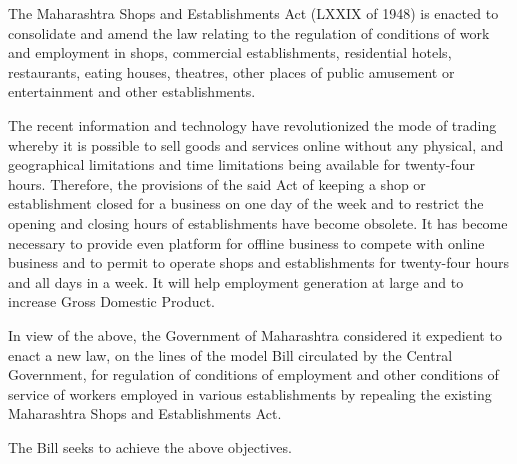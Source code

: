 \documentclass[gaz8,ordinance]{mhact}
\begin{document}
            \begin{sor}

          \item{The Maharashtra Shops and Establishments Act (LXXIX of 1948) is 
enacted to consolidate and amend the law relating to the regulation of 
conditions of work and employment in shops, commercial establishments, 
residential hotels, restaurants, eating houses, theatres, other places of public 
amusement or entertainment and other establishments.}
          
          \item{The recent information and technology have revolutionized the mode 
of trading whereby it is possible to sell goods and services online without 
any physical, and geographical limitations and time limitations being available 
for twenty-four hours. Therefore, the provisions of the said Act of keeping a 
shop or establishment closed for a business on one day of the week and to 
restrict the opening and closing hours of establishments have become obsolete. 
It has become necessary to provide even platform for offline business to 
compete with online business and to permit to operate shops and 
establishments for twenty-four hours and all days in a week. It will help 
employment generation at large and to increase Gross Domestic Product.}
          
          \item{In view of the above, the Government of Maharashtra considered it 
expedient to enact a new law, on the lines of the model Bill circulated by the 
Central Government, for regulation of conditions of employment and other 
conditions of service of workers employed in various establishments by 
repealing the existing Maharashtra Shops and Establishments Act.}
          
          \item{The Bill seeks to achieve the above objectives.}
          

\end{sor}
\end{document}
